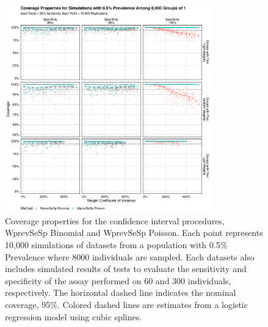 \documentclass[AMA,STIX1COL]{WileyNJD-v2}
\begin{document}
\begin{figure}
\centering
\includegraphics[width=0.8\textwidth]{figures/imperfect_coverage_8000_groups_0_005_prev.pdf}
\caption{Coverage properties for the confidence interval procedures, WprevSeSp Binomial and WprevSeSp Poisson.
Each point represents 10,000 simulations of datasets from a population with 0.5\% Prevalence where 8000 individuals are sampled.
Each datasets also includes simulated results of tests to evaluate the sensitivity and specificity of the assay performed on 60 and 300 individuals, respectively.
The horizontal dashed line indicates the nominal coverage, 95\%.
Colored dashed lines are estimates from a logistic regression model using cubic splines.}
\label{fig:imperfect_coverage_8000_groups_0_005_prev}
\end{figure}
\end{document}

